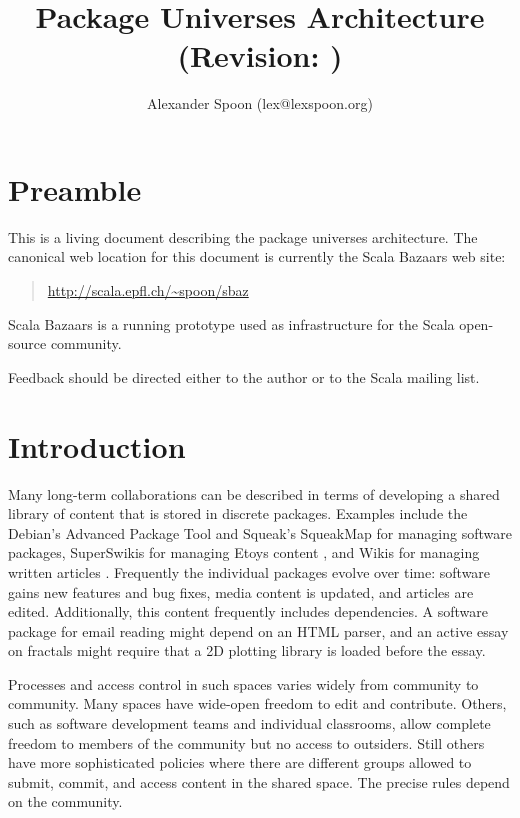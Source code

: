 \documentclass{article}
\begin{document}

\title{Package Universes Architecture\\
       (Revision: )}
\author{Alexander Spoon (lex@lexspoon.org)}
\date{}
\maketitle

\section{Preamble}
This is a living document describing the package universes
architecture.  
The canonical web location for this document is currently the Scala
Bazaars web site:
\begin{quote}
  \url{http://scala.epfl.ch/~spoon/sbaz}
\end{quote}
Scala Bazaars is a running prototype used as infrastructure for the
Scala \cite{scala:spec, scala:web} open-source community.

Feedback should be directed either to the author or to the Scala
mailing list.


\section{Introduction}
Many long-term collaborations can be described in terms of developing
a shared library of content that is stored in discrete packages.  
Examples include the Debian's Advanced Package Tool \cite{apt:howto} and
Squeak's SqueakMap for managing software packages, SuperSwikis for
managing Etoys content \cite{steinmetz02:learning}, and Wikis for
managing written articles \cite{ward01:wikiway}.  Frequently the
individual packages evolve over time: software gains new features and
bug fixes, media content is updated, and articles are edited.
Additionally, this content frequently includes dependencies.  A
software package for email reading might depend on an HTML
parser, and an active essay on fractals might require that
a 2D plotting library is loaded before the essay.

Processes and access control in such spaces varies widely from
community to community.  Many spaces have wide-open freedom to edit
and contribute.  Others, such as software development teams and
individual classrooms, allow complete freedom to members of the
community but no access to outsiders.  Still others have more
sophisticated policies where there are different groups allowed to
submit, commit, and access content in the shared space.  The precise
rules depend on the community.
\end{document}
